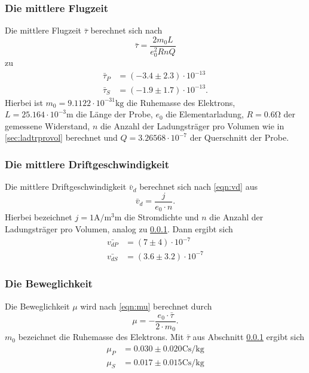     \subsubsection{Die mittlere Flugzeit}
    \label{sec:mitflugz}
      Die mittlere Flugzeit $\bar{\tau}$ berechnet sich nach
      \begin{equation*}
        \bar{\tau} = \frac{2m_{0}L}{e_{0}^{2}RnQ}
      \end{equation*}
      zu
      \begin{align*}
        \bar{\tau}_{P} & = (-3.4 \pm 2.3) \cdot 10^{-13} \\
        \bar{\tau}_{S} & = (-1.9 \pm 1.7) \cdot 10^{-13}.
      \end{align*}
      Hierbei ist $m_{0} = 9.1122 \cdot 10^{-31} \si{\kilo\gram}$ die Ruhemasse des Elektrons, $L = 25.164 \cdot 10^{-3} \si{\meter}$ die Länge der Probe,
      $e_{0}$ die Elementarladung, $R = 0.6 \si{\ohm}$ der gemessene Widerstand, $n$ die Anzahl der Ladungsträger pro Volumen wie in \ref{sec:ladtrprovol} berechnet
      und $Q = 3.26568 \cdot 10^{-7}$ der Querschnitt der Probe.
    \subsubsection{Die mittlere Driftgeschwindigkeit}
      Die mittlere Driftgeschwindigkeit $\bar{v}_d$ berechnet sich nach \ref{eqn:vd} aus
      \begin{equation}
        \bar{v}_d = \frac{j}{e_{0} \cdot n}.
      \end{equation}
      Hierbei bezeichnet $j = 1 \si{\ampere\per\cubic\milli\meter}$ die Stromdichte und $n$ die Anzahl der Ladungsträger pro Volumen, analog zu \ref{sec:mitflugz}.
      Dann ergibt sich
      \begin{align*}
        \bar{v_{dP}} & = (7 \pm 4) \cdot 10^{-7} \\
        \bar{v_{dS}} & = (3.6 \pm 3.2) \cdot 10^{-7}
      \end{align*}
    \subsubsection{Die Beweglichkeit}
      Die Beweglichkeit $\mu$ wird nach \ref{eqn:mu} berechnet durch
      \begin{equation}
        \mu = -\frac{e_{0} \cdot \bar{\tau}}{2 \cdot m_{0}}.
      \end{equation}
      $m_{0}$ bezeichnet die Ruhemasse des Elektrons. Mit $\bar{\tau}$ aus Abschnitt \ref{sec:mitflugz} ergibt sich
      \begin{align*}
        \mu_{P} & = 0.030 \pm 0.020 \si{\coulomb\second\per\kilo\gram}\\
        \mu_{S} & = 0.017 \pm 0.015 \si{\coulomb\second\per\kilo\gram}
      \end{align*}
